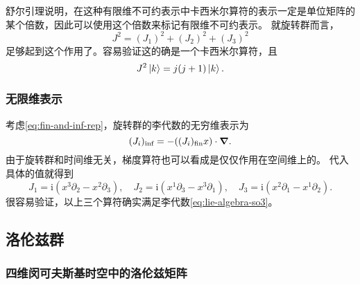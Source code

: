 \documentclass[hyperref, UTF8, a4paper]{ctexart}
\newcommand*{\ii}{\mathrm{i}}
\begin{document}
舒尔引理说明，在这种有限维不可约表示中卡西米尔算符的表示一定是单位矩阵的某个倍数，因此可以使用这个倍数来标记有限维不可约表示。
就旋转群而言，
\begin{equation}
    J^2 = (J_1)^2 + (J_2)^2 + (J_3)^2
\end{equation}
足够起到这个作用了。容易验证这的确是一个卡西米尔算符，且
\begin{equation}
    J^2 \ket{k} = j (j+1) \ket{k}.
\end{equation}

\subsubsection{无限维表示}

考虑\eqref{eq:fin-and-inf-rep}，旋转群的李代数的无穷维表示为
\[
    (J_i)_\text{inf} = - ((J_i)_\text{fin} x) \cdot \grad.
\]
由于旋转群和时间维无关，梯度算符也可以看成是仅仅作用在空间维上的。
代入具体的值就得到
\begin{equation}
    J_1 = \ii (x^3 \partial_2 - x^2 \partial_3), \quad J_2 = \ii (x^1 \partial_3 - x^3 \partial_1), \quad
    J_3 = \ii (x^2 \partial_1 - x^1 \partial_2).
    \label{eq:rotation-inf-rep}
\end{equation}
很容易验证，以上三个算符确实满足李代数\eqref{eq:lie-algebra-so3}。

\subsection{洛伦兹群}

\subsubsection{四维闵可夫斯基时空中的洛伦兹矩阵}
\end{document}
